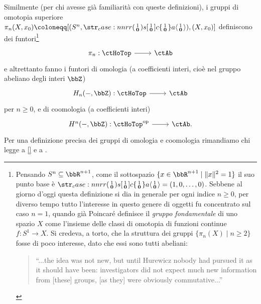 \begin{example}
	Similmente (per chi avesse già familiarità con queste definizioni), i gruppi di omotopia superiore \(\pi_n(X,x_0) \defeq [(S^n,\copmap[r] 1{\mathbf{0}}), (X,x_0)]\) definiscono dei funtori\footnote{Pensando \(S^n\subseteq\bbR^{n+1}\), come il sottospazio \(\{x\in\bbR^{n+1}\mid \|x\|^2=1\}\) il suo punto base è \(\copmap[r]1{\mathbf 0}=(1,0,\dots,0)\). Sebbene al giorno d'oggi questa definizione si dia in generale per ogni indice \(n\ge 0\), per diverso tempo tutto l'interesse in questo genere di oggetti fu concentrato sul caso \(n=1\), quando già Poincaré definisce il \emph{gruppo fondamentale} di uno spazio \(X\) come l'insieme delle classi di omotopia di funzioni continue \(f : S^1 \to X\). Si credeva, a torto, che la struttura dei gruppi \(\{\pi_n(X)\mid n\ge 2\}\) fosse di poco interesse, dato che essi sono tutti abeliani:
	\begin{quote}
		``...the idea was not new, but until Hurewicz nobody had pursued it as it should have been: investigators did not expect much new information from  [these] groups, [as they] were obviously commutative...''
	\end{quote}}
	\[\dmFun{\pi_n}\ctHoTop\ctAb\]
	e altrettanto fanno i funtori di omologia (a coefficienti interi, cioè nel gruppo abeliano degli interi \(\bbZ\))
	\[\dmFun{H_n(-,\bbZ)}\ctHoTop\ctAb\]
	per \(n\ge 0\), e di coomologia (a coefficienti interi)
	\[\dmFun{H^n(-,\bbZ)}{\ctHoTop^\op}{\ctAb.}\]
	Per una definizione precisa dei gruppi di omologia e coomologia rimandiamo chi legge a \ref{} e a \cite[pp. 5--6]{Vick73a}.
\end{example}
